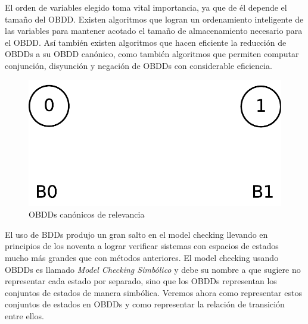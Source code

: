 \documentclass[titlepage, 12pt]{book}
\begin{document}
El orden de variables elegido toma vital importancia, ya que de \'el depende el tama\~no del OBDD. Existen algoritmos que logran un ordenamiento inteligente de las variables para mantener acotado el tama\~no de almacenamiento necesario para el OBDD. As\'i tambi\'en existen algoritmos que hacen eficiente la reducci\'on de OBDDs a su OBDD can\'onico, como tambi\'en algoritmos que permiten computar conjunci\'on, disyunci\'on y negaci\'on de OBDDs con considerable eficiencia.


\begin{figure}[htp]
  \centering
    \includegraphics[scale=0.5]{Imagenes/canonicos.pdf}
  \caption{OBDDs can\'onicos de relevancia}
  \label{canonicos}
\end{figure}



El uso de BDDs produjo un gran salto en el model checking llevando en principios de los noventa a lograr verificar sistemas con espacios de estados mucho m\'as grandes que con m\'etodos anteriores. El model checking usando OBDDs es llamado \textit{Model Checking Simb\'olico} y debe su nombre a que sugiere no representar cada estado por separado, sino que los OBDDs representan los conjuntos de estados de manera simb\'olica. Veremos ahora como representar estos conjuntos de estados en OBDDs y como representar la relaci\'on de transici\'on entre ellos.
\end{document}
